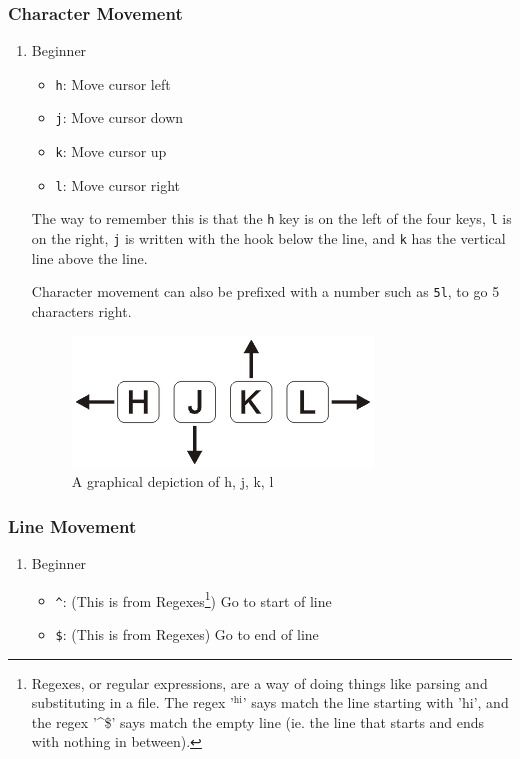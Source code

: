 \documentclass[11pt]{article}
\begin{document}
\subsubsection{Character Movement}
\label{sec:orgc64c993}
\begin{enumerate}
\item Beginner
\label{sec:org69e9926}
\begin{itemize}
\item \texttt{h}: Move cursor left
\item \texttt{j}: Move cursor down
\item \texttt{k}: Move cursor up
\item \texttt{l}: Move cursor right
\end{itemize}

The way to remember this is that the \texttt{h} key is on the left of the four keys,
\texttt{l} is on the right, \texttt{j} is written with the hook below the line, and \texttt{k} has
the vertical line above the line.

Character movement can also be prefixed with a number such as \texttt{5l}, to go
5 characters right.

\begin{figure}[htbp]
\centering
\includegraphics[width=.9\linewidth]{./hjkl.png}
\caption{\label{fig:orge3bb15f}
A graphical depiction of h, j, k, l}
\end{figure}
\end{enumerate}
\subsubsection{Line Movement}
\label{sec:org7261158}
\begin{enumerate}
\item Beginner
\label{sec:org530d2f7}
\begin{itemize}
\item \texttt{\textasciicircum{}}: (This is from Regexes\footnote{Regexes, or regular expressions, are a way of doing things like parsing
and substituting in a file. The regex '\(^{\text{hi}}\)' says match the line starting with
'hi', and the regex '\^{}\$' says match the empty line (ie. the line that starts and
ends with nothing in between).}) Go to start of line
\item \texttt{\$}: (This is from Regexes) Go to end of line
\end{itemize}
\end{enumerate}
\end{document}
